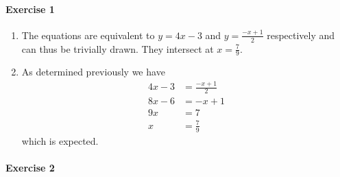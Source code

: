 \documentclass{article}
\begin{document}
\paragraph{Exercise 1}

\begin{enumerate}
    \item The equations are equivalent to $y = 4x - 3$ and $y = \frac{-x + 1}{2}$ respectively and can thus be trivially drawn. They intersect at $x = \frac{7}{9}$.
    
    \item As determined previously we have
    \begin{align*}
        4x - 3 &= \frac{-x + 1}{2} \\
        8x - 6 &= -x + 1 \\
        9x &= 7 \\
        x &= \frac{7}{9}
    \end{align*}
    which is expected.
\end{enumerate}

\paragraph{Exercise 2}
\end{document}
